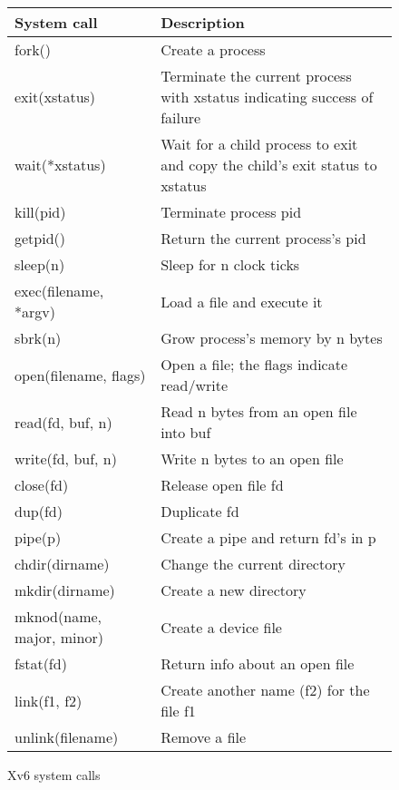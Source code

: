 \begin{figure}[t]
\center
\begin{tabular}{ll}
{\bf System call} & {\bf Description} \\
\midrule
fork() & Create a process \\
exit(xstatus) & Terminate the current process with xstatus indicating success of failure \\
wait(*xstatus) & Wait for a child process to exit and copy the child's exit status to xstatus \\
kill(pid) & Terminate process pid \\
getpid() & Return the current process's pid \\
sleep(n) & Sleep for n clock ticks \\
exec(filename, *argv) & Load a file and execute it \\
sbrk(n) & Grow process's memory by n bytes \\
open(filename, flags) & Open a file; the flags indicate read/write \\
read(fd, buf, n) & Read n bytes from an open file into buf \\
write(fd, buf, n) & Write n bytes to an open file \\
close(fd) & Release open file fd \\
dup(fd) & Duplicate fd \\
pipe(p) & Create a pipe and return fd's in p \\
chdir(dirname) & Change the current directory \\
mkdir(dirname) & Create a new directory \\
mknod(name, major, minor) & Create a device file \\
fstat(fd) & Return info about an open file \\
link(f1, f2) & Create another name (f2) for the file f1 \\
unlink(filename) & Remove a file \\
\end{tabular}
\caption{Xv6 system calls}
\label{fig:api}
\end{figure}

